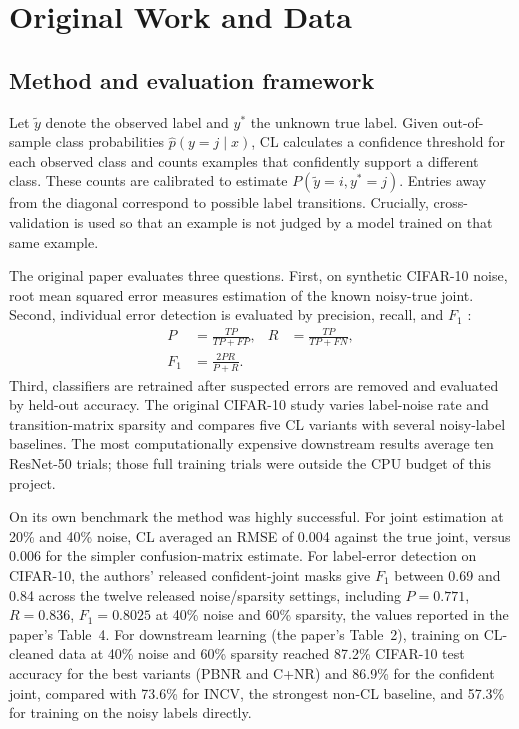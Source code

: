\documentclass[11pt]{article}
\begin{document}
\section{Original Work and Data}

\subsection{Method and evaluation framework}

Let $\tilde{y}$ denote the observed label and $y^*$ the unknown true label.
Given out-of-sample class probabilities $\hat{p}(y=j\mid x)$, CL calculates a
confidence threshold for each observed class and counts examples that
confidently support a different class. These counts are calibrated to estimate
$P(\tilde{y}=i,y^*=j)$. Entries away from the diagonal correspond to possible
label transitions. Crucially, cross-validation is used so that an example is
not judged by a model trained on that same example.

The original paper evaluates three questions. First, on synthetic CIFAR-10
noise, root mean squared error measures estimation of the known noisy-true
joint. Second, individual error detection is evaluated by precision, recall,
and $F_1$ \citep{sokolova2009systematic}:
\begin{equation}
\begin{aligned}
P&=\frac{TP}{TP+FP}, &
R&=\frac{TP}{TP+FN},\\
F_1&=\frac{2PR}{P+R}.
\end{aligned}
\end{equation}
Third, classifiers are retrained after suspected errors are removed and
evaluated by held-out accuracy. The original CIFAR-10 study varies label-noise
rate and transition-matrix sparsity and compares five CL variants with several
noisy-label baselines. The most computationally expensive downstream results
average ten ResNet-50 trials; those full training trials were outside the CPU
budget of this project.

On its own benchmark the method was highly successful. For joint estimation
at 20\% and 40\% noise, CL averaged an RMSE of 0.004 against the true joint,
versus 0.006 for the simpler confusion-matrix estimate. For label-error
detection on CIFAR-10, the authors' released confident-joint masks give $F_1$
between 0.69 and 0.84 across the twelve released noise/sparsity settings,
including $P=0.771$, $R=0.836$, $F_1=0.8025$ at 40\% noise and 60\% sparsity,
the values reported in the paper's Table~4. For downstream learning (the paper's Table~2), training on
CL-cleaned data at 40\% noise and 60\% sparsity reached 87.2\% CIFAR-10 test
accuracy for the best variants (PBNR and C+NR) and 86.9\% for the confident
joint, compared with 73.6\% for INCV, the strongest non-CL baseline, and
57.3\% for training on the noisy labels directly.
\end{document}
